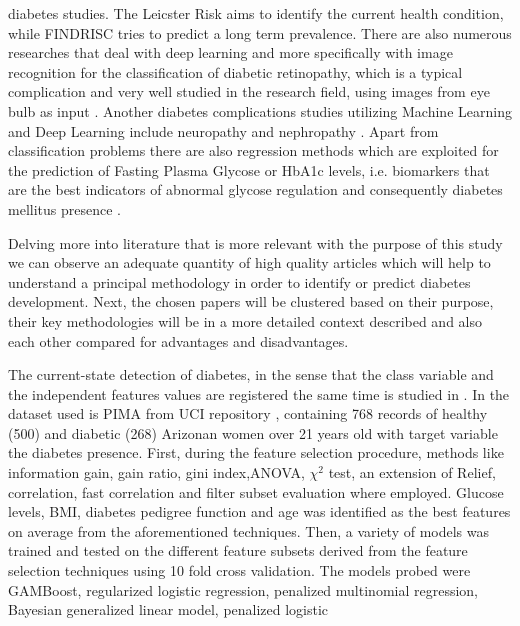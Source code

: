 \documentclass[journal,article,submit,pdftex,moreauthors]{Definitions/mdpi}
\begin{document}
diabetes studies. The Leicster Risk aims to identify the current health condition, 
while FINDRISC tries to predict a long term prevalence.
There are also numerous researches that deal with deep learning
and  more specifically with image recognition for the classification of 
diabetic retinopathy, which is a typical complication and very well studied 
in the research field, using images from eye bulb as input 
\cite{Fregoso,KAVAKIOTIS2017104}. Another diabetes complications
studies utilizing Machine Learning and Deep Learning include neuropathy and nephropathy 
\cite{Fregoso,KAVAKIOTIS2017104}. Apart from classification 
problems there are also regression methods which are exploited 
for the prediction of Fasting Plasma Glycose or HbA1c levels, 
i.e. biomarkers that are the best indicators of abnormal 
glycose regulation and consequently diabetes  mellitus presence 
\cite{Fregoso,KAVAKIOTIS2017104,kopitar2020early}.
\par Delving more into literature that is more relevant with the purpose of this 
study we can observe an adequate quantity of high quality articles which will help
to understand a principal methodology in order to identify or predict diabetes 
development. Next, the chosen papers will be clustered based on their purpose, their key
methodologies will be in a more detailed context described and also each other compared
for advantages and disadvantages.
\par The current-state detection of diabetes, in the sense that the class variable and the
independent features values are registered the same time is studied in \cite{Howlader,
kopitar2020early, Lai, Zou, Dinh, zhang, Xiong, Rufo, Benita,  Dritsas}.
In \cite{Howlader} the dataset used is PIMA from UCI repository \cite{Dua:2019}, 
containing 768 records of healthy (500) and diabetic (268) Arizonan women over 21 
years old with target variable the diabetes presence. First, during the feature 
selection procedure, methods like information gain, gain ratio, gini index,ANOVA, 
$\chi^2$ test, an extension of Relief, correlation, fast correlation and filter 
subset evaluation where employed. Glucose levels, BMI, diabetes pedigree function 
and age was identified as the best features on average from the aforementioned 
techniques. Then, a variety of models was trained and tested on the different feature
subsets derived from the feature selection techniques using 10 fold cross validation.
The models probed were GAMBoost, regularized logistic regression, penalized 
multinomial regression, Bayesian generalized linear model, penalized logistic 
\end{document}
